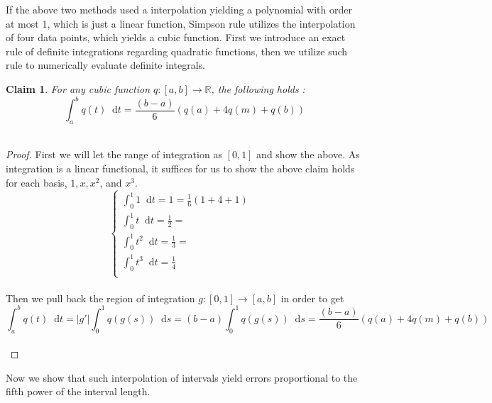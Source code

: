 \documentclass[paper=a4, fontsize=11pt]{scrartcl}
\newcommand*\dif{\mathop{}\!\mathrm{d}}
\newtheorem{claim}{Claim}
\begin{document}
If the above two methods used a interpolation yielding a polynomial with order at most 1, which is just a linear function, Simpson rule utilizes the interpolation of four data points, which yields a cubic function. First we introduce an exact rule of definite integrations regarding quadratic functions, then we utilize such rule to numerically evaluate definite integrals. \\

\begin{claim}
	For any cubic function $q:[a,b] \to \mathbb{R}$, the following holds :\\
	
	\begin{equation}\nonumber
		\int_{a}^{b} q(t) \dif t = \frac{(b-a)}{6}(q(a) + 4 q(m) + q(b))
	\end{equation}\\
\end{claim}

\begin{proof}
	First we will let the range of integration as $[0,1]$ and show the above. As integration is a linear functional, it suffices for us to show the above claim holds for each basis, $1,x,x^2$, and $x^3$.\\
	
	\begin{equation}\nonumber
		\begin{cases} 
		\int_{0}^{1} 1 \dif t = 1 = \frac{1}{6}(1+4+1)& \\[1.5ex]
		\int_{0}^{1} t  \dif t = \frac{1}{2} =& \\[1.5ex]
		\int_{0}^{1} t^2 \dif t = \frac{1}{3}=& \\[1.5ex]
		\int_{0}^{1} t^3 \dif t = \frac{1}{4}& \\[1.5ex]
		\end{cases}
	\end{equation}\\
	
	Then we pull back the region of integration $g:[0,1] \to [a,b]$ in order to get \\
	
	\begin{equation}\nonumber
		\int_{a}^{b} q(t) \dif t = |g'| \int_{0}^{1} q(g(s)) \dif s = (b-a) \int_{0}^{1} q(g(s)) \dif s = \frac{(b-a)}{6}(q(a) + 4 q(m) + q(b))
	\end{equation}\\
\end{proof}

Now we show that such interpolation of intervals yield errors proportional to the fifth power of the interval length. \\
\end{document}
